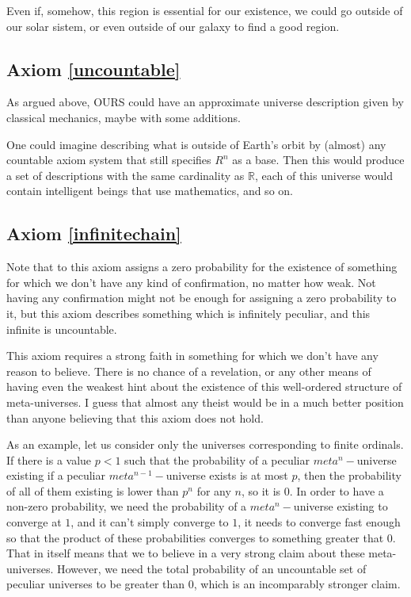 \documentclass[a4paper
,draft
]{article}
\def\reale{\mathbb{R}}
\begin{document}
Even if, somehow, this region is essential for our existence, we could go outside of our solar sistem, or even outside of our galaxy to find a good region.

\subsection{Axiom \ref{uncountable}}

As argued above, OURS could have an approximate universe description given by classical mechanics, maybe with some additions.

One could imagine describing what is outside of Earth's orbit by (almost) any countable axiom system that still specifies $R^n$ as a base. Then this would produce a set of descriptions with the same cardinality as $\reale$, each of this universe would contain intelligent beings that use mathematics, and so on.

\subsection{Axiom \ref{infinitechain}}

Note that to this axiom assigns a zero probability for the existence of something for which we don't have any kind of confirmation, no matter how weak. Not having any confirmation might not be enough for assigning a zero probability to it, but this axiom describes something which is infinitely peculiar, and this infinite is uncountable.

This axiom requires a strong faith in something for which we don't have any reason to believe. There is no chance of a revelation, or any other means of having even the weakest hint about the existence of this well-ordered structure of meta-universes. I guess that almost any theist would be in a much better position than anyone believing that this axiom does not hold.

As an example, let us consider only the universes corresponding to finite ordinals. If there is a value $p < 1$ such that the probability of a peculiar $meta^n-$universe existing if a peculiar $meta^{n-1}-$universe exists is at most $p$, then the probability of all of them existing is lower than $p^n$ for any $n$, so it is $0$. In order to have a non-zero probability, we need the probability of a $meta^n-$universe existing to converge at $1$, and it can't simply converge to $1$, it needs to converge fast enough so that the product of these probabilities converges to something greater that 0. That in itself means that we to believe in a very strong claim about these meta-universes. However, we need the total probability of an uncountable set of peculiar universes to be greater than 0, which is an incomparably stronger claim.
\end{document}
